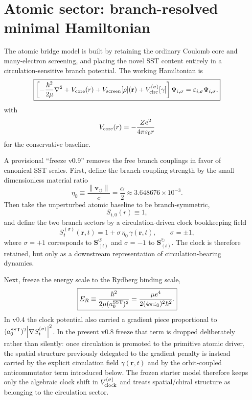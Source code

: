 \documentclass[11pt,a4paper]{article}
\begin{document}
\section{Atomic sector: branch-resolved minimal Hamiltonian}
The atomic bridge model is built by retaining the ordinary Coulomb core and many-electron screening, and placing the novel SST content entirely in a circulation-sensitive branch potential. The working Hamiltonian is
\begin{equation}
\label{eq:master-H}
\boxed{
\left[
-\frac{\hbar^2}{2\mu}\nabla^2
+V_{\rm core}(r)
+V_{\rm screen}[\rho](\mathbf r)
+V_{\rm circ}^{(\sigma)}[\gamma]
\right]\Psi_{i,\sigma}
=\varepsilon_{i,\sigma}\Psi_{i,\sigma},
}
\end{equation}
with
\begin{equation}
\label{eq:Vcore}
V_{\rm core}(r)=-\frac{Ze^2}{4\pi\varepsilon_0 r}
\end{equation}
for the conservative baseline.

A provisional ``freeze v0.9'' removes the free branch couplings in favor of canonical SST scales. First, define the branch-coupling strength by the small dimensionless material ratio
\begin{equation}
\label{eq:eta0}
\boxed{
\eta_0 \equiv \frac{\lVert\mathbf{v}_{\!\boldsymbol{\circlearrowleft}}\rVert}{c} = \frac{\alpha}{2} \approx 3.648676\times 10^{-3}.
}
\end{equation}
Then take the unperturbed atomic baseline to be branch-symmetric,
\begin{equation}
\label{eq:St0freeze}
S_{t,0}(r)\equiv 1,
\end{equation}
and define the two branch sectors by a circulation-driven clock bookkeeping field
\begin{equation}
\label{eq:StBranches}
\boxed{
S_t^{(\sigma)}(\mathbf r,t)=1+\sigma\,\eta_0\,\gamma(\mathbf r,t),
\qquad
\sigma=\pm 1,
}
\end{equation}
where $\sigma=+1$ corresponds to $\mathbf{S}_{(t)}^{\!\boldsymbol{\circlearrowleft}}$ and $\sigma=-1$ to $\mathbf{S}_{(t)}^{\!\boldsymbol{\circlearrowright}}$. The clock is therefore retained, but only as a downstream representation of circulation-bearing dynamics.

Next, freeze the energy scale to the Rydberg binding scale,
\begin{equation}
\label{eq:ERfreeze}
\boxed{
E_R \equiv \frac{\hbar^2}{2\mu (a_0^{\rm SST})^2}
= \frac{\mu e^4}{2(4\pi\varepsilon_0)^2\hbar^2}.
}
\end{equation}
In v0.4 the clock potential also carried a gradient piece proportional to $(a_0^{\rm SST})^2\abs{\nabla S_t^{(\sigma)}}^2$. In the present v0.8 freeze that term is dropped deliberately rather than silently: once circulation is promoted to the primitive atomic driver, the spatial structure previously delegated to the gradient penalty is instead carried by the explicit circulation field $\gamma(\mathbf r,t)$ and by the orbit-coupled anticommutator term introduced below. The frozen starter model therefore keeps only the algebraic clock shift in $V_{\rm clock}^{(\sigma)}$ and treats spatial/chiral structure as belonging to the circulation sector.
\end{document}
